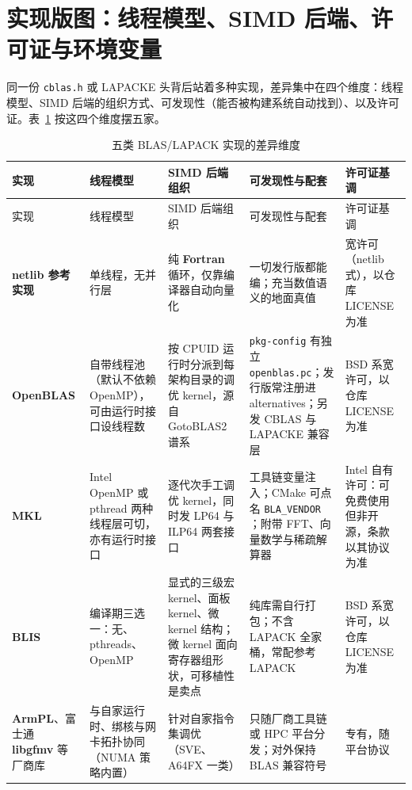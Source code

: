 \documentclass[12pt,a4paper,fontset=fandol]{ctexbook}
\newcommand{\Tp}[1]{\texttt{#1}}
\newcommand{\Bk}{\allowbreak}
\newcommand{\Lib}[1]{\textbf{#1}}
\newcommand{\Lang}[1]{\textsf{\bfseries #1}}
\newcommand{\FTN}{\Lang{Fortran}}
\begin{document}
\section{实现版图：线程模型、SIMD 后端、许可证与环境变量}

同一份 \Tp{cblas.h} 或 LAPACKE 头背后站着多种实现，差异集中在四个维度：线程模型、SIMD 后端的组织方式、可发现性（能否被构建系统自动找到）、以及许可证。表~\ref{tab:ch04-impls} 按这四个维度摆五家。

\begin{longtable}{@{}>{\raggedright\arraybackslash}p{}
  >{\raggedright\arraybackslash}p{}
  >{\raggedright\arraybackslash}p{}
  >{\raggedright\arraybackslash}p{}
  >{\raggedright\arraybackslash}p{}@{}}
\caption{五类 BLAS/LAPACK 实现的差异维度}\label{tab:ch04-impls}\\
\toprule
实现 & 线程模型 & SIMD 后端组织 & 可发现性与配套 & 许可证基调 \\
\midrule
\endfirsthead
\toprule
实现 & 线程模型 & SIMD 后端组织 & 可发现性与配套 & 许可证基调 \\
\midrule
\endhead
\Lib{netlib 参考实现} & 单线程，无并行层 &
  纯 \FTN{} 循环，仅靠编译器自动向量化 &
  一切发行版都能编；充当数值语义的地面真值 &
  宽许可（netlib 式），以仓库 LICENSE 为准 \\
\Lib{OpenBLAS} & 自带线程池（默认不依赖 OpenMP），可由运行时接口设线程数 &
  按 CPUID 运行时分派到每架构目录的调优 kernel，源自 GotoBLAS2 谱系 &
  \Tp{pkg-config} \Bk{} 有独立 \Tp{openblas.pc}；发行版常注册进 alternatives；另发 CBLAS 与 LAPACKE 兼容层 &
  BSD 系宽许可，以仓库 LICENSE 为准 \\
\Lib{MKL} & Intel OpenMP 或 pthread 两种线程层可切，亦有运行时接口 &
  逐代次手工调优 kernel，同时发 LP64 与 ILP64 两套接口 &
  工具链变量注入；CMake 可点名 \Tp{BLA\_VENDOR} \Bk{}；附带 FFT、向量数学与稀疏解算器 &
  Intel 自有许可：可免费使用但非开源，条款以其协议为准 \\
\Lib{BLIS} & 编译期三选一：无、pthreads、OpenMP &
  显式的三级宏 kernel、面板 kernel、微 kernel 结构；微 kernel 面向寄存器组形状，可移植性是卖点 &
  纯库需自行打包；不含 LAPACK 全家桶，常配参考 LAPACK &
  BSD 系宽许可，以仓库 LICENSE 为准 \\
\Lib{ArmPL}、富士通 \Lib{libgfmv} 等厂商库 & 与自家运行时、绑核与网卡拓扑协同（NUMA 策略内置） &
  针对自家指令集调优（SVE、A64FX 一类） &
  只随厂商工具链或 HPC 平台分发；对外保持 BLAS 兼容符号 &
  专有，随平台协议 \\
\bottomrule
\end{longtable}
\end{document}
